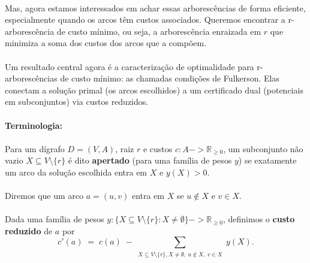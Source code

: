 \documentclass[12pt,a4paper]{article}
\def\\{}%
\def\emph#1{#1}%
\def\to{->}%
\begin{document}
\paragraph{}
Mas, agora estamos interessados em achar essas arborescências de forma eficiente, especialmente quando os arcos têm custos associados. Queremos encontrar a r-arborescência de custo mínimo, ou seja, a arborescência enraizada em \(r\) que minimiza a soma dos custos dos arcos que a compõem.

\paragraph{}
Um resultado central agora é a caracterização de \emph{optimalidade} para r-arborescências de custo mínimo: as chamadas \emph{condições de Fulkerson}. Elas conectam a solução primal (os arcos escolhidos) a um certificado dual (potenciais em subconjuntos) via custos reduzidos.

\paragraph{Terminologia:}
\paragraph{}
Para um dígrafo $D=(V,A)$, raiz $r$ e custos $c:A\to \mathbb{R}_{\ge 0}$, um subconjunto não vazio $X\subseteq V\setminus\{r\}$ é dito \textbf{apertado} (para uma família de pesos $y$) se exatamente um arco da solução escolhida entra em $X$ e $y(X)>0$.

\paragraph{}
Diremos que um arco $a=(u,v)$ \emph{entra} em $X$ se $u\notin X$ e $v\in X$.

\paragraph{}
Dada uma família de pesos $y: \{X\subseteq V\setminus\{r\}: X\neq\emptyset\}\to \mathbb{R}_{\ge 0}$, definimos o \textbf{custo reduzido} de $a$ por
\[
    c'(a) \;=\; c(a)\; - \sum_{\substack{X\subseteq V\setminus\{r\},\\ X\neq\emptyset,\ u\notin X,\ v\in X}} y(X).
\]
\end{document}
